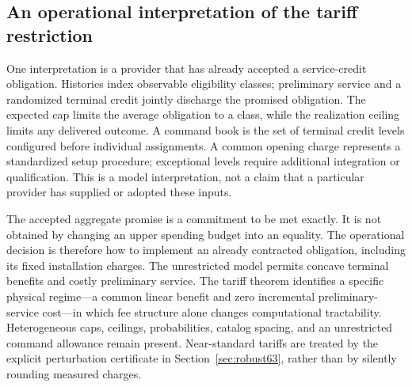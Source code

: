 \subsection{An operational interpretation of the tariff restriction}\label{sec:institution63}
One interpretation is a provider that has already accepted a service-credit obligation. Histories index observable eligibility classes; preliminary service and a randomized terminal credit jointly discharge the promised obligation. The expected cap limits the average obligation to a class, while the realization ceiling limits any delivered outcome. A command book is the set of terminal credit levels configured before individual assignments. A common opening charge represents a standardized setup procedure; exceptional levels require additional integration or qualification. This is a model interpretation, not a claim that a particular provider has supplied or adopted these inputs.

The accepted aggregate promise is a commitment to be met exactly. It is not obtained by changing an upper spending budget into an equality. The operational decision is therefore how to implement an already contracted obligation, including its fixed installation charges. The unrestricted model permits concave terminal benefits and costly preliminary service. The tariff theorem identifies a specific physical regime---a common linear benefit and zero incremental preliminary-service cost---in which fee structure alone changes computational tractability. Heterogeneous caps, ceilings, probabilities, catalog spacing, and an unrestricted command allowance remain present. Near-standard tariffs are treated by the explicit perturbation certificate in Section~\ref{sec:robust63}, rather than by silently rounding measured charges.
